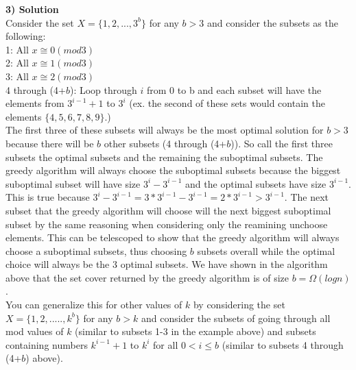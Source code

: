\documentclass[11pt]{article}
\begin{document}
\textbf{3) Solution}\\
Consider the set $X = \{1,2,..., 3^b\}$ for any $b > 3$ and consider the subsets as the following: \\
1: All $x \cong 0 (mod 3)$\\
2: All $x \cong 1 (mod 3)$\\
3: All $x \cong 2 (mod 3)$\\
4 through (4+$b$): Loop through $i$ from 0 to b and each subset will have the elements from $3^{i-1}+1$ to $3^i$ (ex. the second of these sets would contain the elements $\{4,5,6,7,8,9\}$.)\\
The first three of these subsets will always be the most optimal solution for $b >3$ because there will be $b$ other subsets (4 through (4+$b$)). So call the first three subsets the optimal subsets and the remaining the suboptimal subsets. The greedy algorithm will always choose the suboptimal subsets because the biggest suboptimal subset will have size $3^i - 3^{i-1}$ and the optimal subsets have size $3^{i-1}$. This is true because $3^i-3^{i-1}=3*3^{i-1}- 3^{i-1} = 2* 3^{i-1} > 3^{i-1}$. The next subset that the greedy algorithm will choose will the next biggest suboptimal subset by the same reasoning when considering only the reamining unchoose elements. This can be telescoped to show that the greedy algorithm will always choose a suboptimal subsets, thus choosing $b$ subsets overall while the optimal choice will always be the 3 optimal subsets. We have shown in the algorithm above that the set cover returned by the greedy algorithm is of size $b = \Omega (log n)$.\\
You can generalize this for other values of $k$ by considering the set $X = \{1, 2, ....., k^b\}$ for any $b>k$ and consider the subsets of going through all mod values of $k$ (similar to subsets 1-3 in the example above) and subsets containing numbers $k^{i-1} +1$ to $k^i$ for all $0<i \leq b$ (similar to subsets 4 through (4+$b$) above).\\
\end{document}
